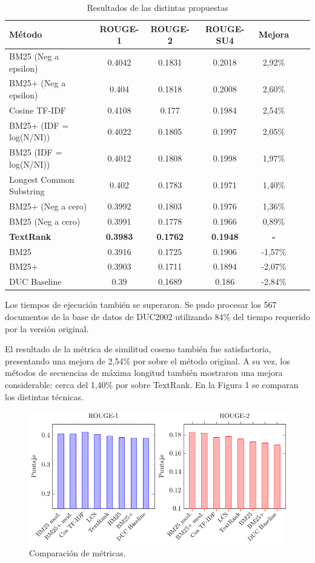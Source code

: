 \documentclass[a4paper]{article}
\begin{document}
\begin{table}
\caption{Resultados de las distintas propuestas}
\begin{center}
\begin{tabular}{l*{5}{c}r}
\hline
\rule{0pt}{12pt}
Método & ROUGE-1 & ROUGE-2 & ROUGE-SU4 & Mejora \\[2pt]
\hline\rule{0pt}{12pt}
BM25 (Neg a epsilon) & 0.4042 & 0.1831 & 0.2018 & 2,92\% \\
BM25+ (Neg a epsilon) & 0.404 & 0.1818 & 0.2008 & 2,60\% \\
Cosine TF-IDF & 0.4108 & 0.177 & 0.1984 & 2,54\% \\
BM25+ (IDF = log(N/NI)) & 0.4022 & 0.1805 & 0.1997 & 2,05\% \\ 
BM25 (IDF = log(N/NI)) & 0.4012 & 0.1808 & 0.1998 & 1,97\% \\ 
Longest Common Substring & 0.402 & 0.1783 & 0.1971 & 1,40\% \\
BM25+ (Neg a cero) & 0.3992 & 0.1803 & 0.1976 & 1,36\% \\ 
BM25 (Neg a cero) & 0.3991 & 0.1778 & 0.1966 & 0,89\% \\
\textbf{TextRank} & \textbf{0.3983} & \textbf{0.1762} & \textbf{0.1948} & \textbf{-}\\
BM25 & 0.3916 & 0.1725 & 0.1906 & -1,57\% \\
BM25+ & 0.3903 & 0.1711 & 0.1894 & -2,07\% \\
DUC Baseline & 0.39 & 0.1689 & 0.186 & -2,84\% \\ [2pt]
\hline
\end{tabular}
\end{center}
\end{table}


Los tiempos de ejecución también se superaron. Se pudo procesar los 567 documentos de la base de datos de DUC2002 utilizando 84\% del tiempo requerido por la versión original.

El resultado de la métrica de similitud coseno también fue satisfactoria, presentando una mejora de 2,54\% por sobre el método original. A su vez, los métodos de secuencias de máxima longitud también mostraron una mejora considerable: cerca del 1,40\% por sobre TextRank. En la Figura 1 se comparan los distintas técnicas.

\begin{figure}[h!]
    \centering
    \includegraphics[width=1\textwidth]{rouge-scores.pdf}
    \caption{Comparación de métricas.}
\end{figure}
\end{document}
